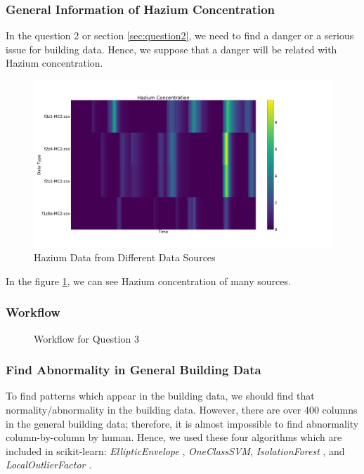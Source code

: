 \documentclass[aps, 10pt, a4paper]{article}
\begin{document}
            \subsubsection{General Information of Hazium Concentration}
                In the question 2 or section \ref{sec:question2}, we need to find a danger or a serious issue for building data. Hence, we suppose that a danger will be related with Hazium concentration.
                
                \begin{figure}[htbp]
                    \centering
                    \includegraphics[width=0.4 \linewidth]{figures/hazium.png}
                    \caption{Hazium Data from Different Data Sources}
                    \label{fig:generalhazium}
                \end{figure}
            
                In the figure \ref{fig:generalhazium}, we can see Hazium concentration of many sources. 

            \subsubsection{Workflow}
                \begin{figure}[htbp]
                    \centering
                    \begin{tikzpicture}[node distance = 2cm, auto]
                    \end{tikzpicture}
                    \caption{Workflow for Question 3}
                    \label{fig:workflow3}
                \end{figure}
            
            \subsubsection{Find Abnormality in General Building Data}       
                To find patterns which appear in the building data, we should find that normality/abnormality in the building data. However, there are over 400 columns in the general building data; therefore, it is almost impossible to find abnormality column-by-column by human. Hence, we used these four algorithms which are included in scikit-learn: \textit{EllipticEnvelope} \cite{ref:normal1}, \textit{OneClassSVM}, \textit{IsolationForest} \cite{ref:normal2, ref:normal3}, and \textit{LocalOutlierFactor} \cite{ref:normal4}.
                
\end{document}
